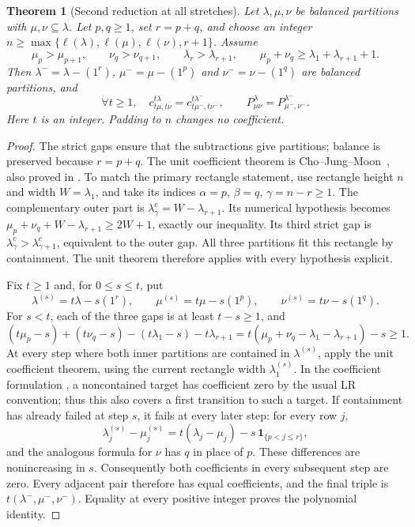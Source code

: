 \documentclass[11pt]{article}
\newtheorem{theorem}{Theorem}
\begin{document}
\begin{theorem}[Second reduction at all stretches]\label{thm:second}
Let $\lambda,\mu,\nu$ be balanced partitions with
$\mu,\nu\subseteq\lambda$. Let $p,q\ge1$, set $r=p+q$, and choose
an integer $n\ge\max\{\ell(\lambda),\ell(\mu),\ell(\nu),r+1\}$.
Assume
\[
 \mu_p>\mu_{p+1},\qquad \nu_q>\nu_{q+1},\qquad
 \lambda_r>\lambda_{r+1},\qquad
 \mu_p+\nu_q\ge\lambda_1+\lambda_{r+1}+1.
\]
Then $\lambda^- =\lambda-(1^r)$,
$\mu^- =\mu-(1^p)$ and $\nu^- =\nu-(1^q)$ are balanced partitions,
and
\[
 \forall t\ge1,\quad
 c^{t\lambda}_{t\mu,t\nu}=c^{t\lambda^-}_{t\mu^-,t\nu^-},
 \qquad P^\lambda_{\mu\nu}=P^{\lambda^-}_{\mu^-,\nu^-}.
\]
Here $t$ is an integer. Padding to $n$ changes no coefficient.
\end{theorem}
\begin{proof}
The strict gaps ensure that the subtractions give partitions; balance
is preserved because $r=p+q$. The unit coefficient theorem is
Cho--Jung--Moon~\cite[Theorem 2.6]{CJMsecond}, also proved in
\cite[Theorem 3.1]{CJMfpsac}. To match the primary rectangle statement,
use rectangle height $n$ and width $W=\lambda_1$, and take its indices
$\alpha=p$, $\beta=q$, $\gamma=n-r\ge1$.
The complementary outer part is
$\lambda^c_{\gamma}=W-\lambda_{r+1}$.
Its numerical hypothesis becomes
$\mu_p+\nu_q+W-\lambda_{r+1}\ge2W+1$, exactly our inequality.
Its third strict gap is
$\lambda^c_\gamma>\lambda^c_{\gamma+1}$, equivalent to the outer gap.
All three partitions fit this rectangle by containment. The unit theorem
therefore applies with every hypothesis explicit.

Fix $t\ge1$ and, for $0\le s\le t$, put
\[
 \lambda^{(s)}=t\lambda-s(1^r),\qquad
 \mu^{(s)}=t\mu-s(1^p),\qquad
 \nu^{(s)}=t\nu-s(1^q).
\]
For $s<t$, each of the three gaps is at least $t-s\ge1$, and
\[
 (t\mu_p-s)+(t\nu_q-s)
 -(t\lambda_1-s)-t\lambda_{r+1}
 =t(\mu_p+\nu_q-\lambda_1-\lambda_{r+1})-s\ge1.
\]
At every step where both inner partitions are contained in
$\lambda^{(s)}$, apply the unit coefficient theorem, using the current
rectangle width $\lambda^{(s)}_1$. In the coefficient formulation
\cite[Theorem 3.1]{CJMfpsac}, a noncontained target has coefficient zero
by the usual LR convention; thus this also covers a first transition
to such a target.
If containment has already failed at step $s$, it fails at every later
step: for every row $j$,
\[
 \lambda^{(s)}_j-\mu^{(s)}_j
 =t(\lambda_j-\mu_j)-s\,\mathbf1_{\{p<j\le r\}},
\]
and the analogous formula for $\nu$ has $q$ in place of $p$.
These differences are nonincreasing in $s$. Consequently both
coefficients in every subsequent step are zero. Every adjacent pair
therefore has equal coefficients, and the final triple is
$t(\lambda^-,\mu^-,\nu^-)$. Equality at every positive integer proves
the polynomial identity.
\end{proof}
\end{document}
